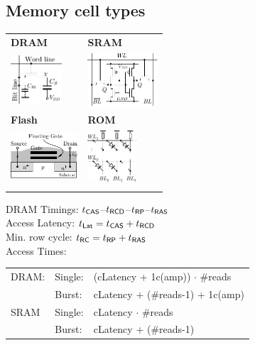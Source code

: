 \begin{sectionbox}
	\subsection{Memory cell types} 
	\begin{tabular*}{\columnwidth}{@{\extracolsep\fill}ll@{}} \ctrule
		\large \bf DRAM & \large \bf SRAM \\ 
		\includegraphics[width = 1.9cm]{./img/DRAM} & \includegraphics[width = 2.6cm]{./img/SRAM} \\[2em]
		\large \bf Flash & \large \bf ROM \\
		\includegraphics[width = 2.5cm]{./img/flash} & \includegraphics[width = 1.8cm]{./img/ROM}\\ \cbrule
	\end{tabular*}
	
	DRAM Timings: $t_{\sf CAS}$--$t_{\sf RCD}$--$t_{\sf RP}$--$t_{\sf RAS}$\\
	Access Latency: $t_{\sf Lat} = t_{\sf CAS} + t_{\sf RCD}$\\
	Min. row cycle: $t_{\sf RC} = t_{\sf RP} + t_{\sf RAS}$\\
	
	
	Access Times:\\
	\begin{tabular}{lll}
	DRAM: & Single: & (cLatency + 1c(amp)) $\cdot$ \#reads\\
		& Burst: & cLatency + (\#reads-1) + 1c(amp)\\
	SRAM & Single: & cLatency $\cdot$ \#reads\\
		& Burst: & cLatency + (\#reads-1)
	\end{tabular}
\end{sectionbox}







